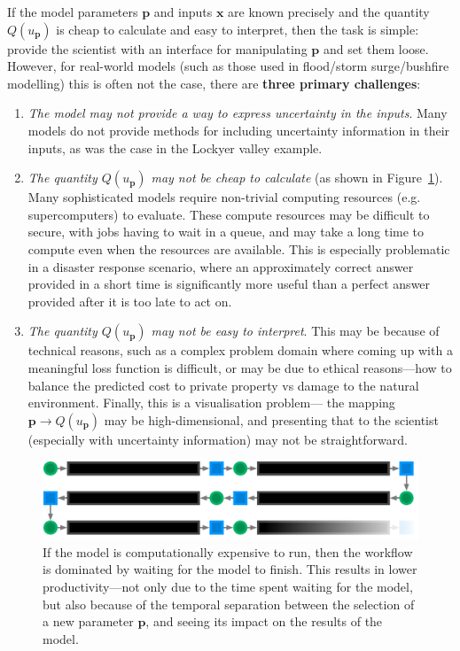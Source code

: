 \documentclass[a4paper,fontsize=12pt]{scrartcl}
\begin{document}
If the model parameters $\mathbf{p}$ and inputs $\mathbf{x}$ are known
precisely and the quantity $Q(u_{\mathbf{p}})$ is cheap to calculate
and easy to interpret, then the task is simple: provide the scientist
with an interface for manipulating $\mathbf{p}$ and set them loose.
However, for real-world models (such as those used in flood/storm
surge/bushfire modelling) this is often not the case, there are \textbf{three
primary challenges}:
\begin{enumerate}
\item \emph{The model may not provide a way to express uncertainty in
    the inputs}. Many models do not provide methods for including
  uncertainty information in their inputs, as was the case in the
  Lockyer valley example.
\item \emph{The quantity $Q(u_{\mathbf{p}})$ may not be cheap to
    calculate} (as shown in Figure~\ref{fig:long-fb-loop.pdf}). Many
  sophisticated models require non-trivial computing resources (e.g.
  supercomputers) to evaluate. These compute resources may be
  difficult to secure, with jobs having to wait in a queue, and may
  take a long time to compute even when the resources are available.
  This is especially problematic in a disaster response scenario,
  where an approximately correct answer provided in a short time is
  significantly more useful than a perfect answer provided after it is
  too late to act on.
\item \emph{The quantity $Q(u_{\mathbf{p}})$ may not be easy to
    interpret}. This may be because of technical reasons, such as a
  complex problem domain where coming up with a meaningful loss
  function is difficult, or may be due to ethical reasons---how to
  balance the predicted cost to private property vs damage to the
  natural environment. Finally, this is a visualisation problem---
  the mapping $\mathbf{p} \rightarrow Q(u_{\mathbf{p}})$ may be high-dimensional,
  and presenting that to the scientist (especially with uncertainty
  information) may not be straightforward.
\end{enumerate}
\begin{figure}
  \centering
  \includegraphics[width=\textwidth]{figures/long-fb-loop.pdf}
  \caption{If the model is computationally expensive to run, then the
    workflow is dominated by waiting for the model to finish. This
    results in lower productivity---not only due to the time spent
    waiting for the model, but also because of the temporal separation
  between the selection of a new parameter $\mathbf{p}$, and seeing
  its impact on the results of the model.}
  \label{fig:long-fb-loop.pdf}
\end{figure}
\end{document}
